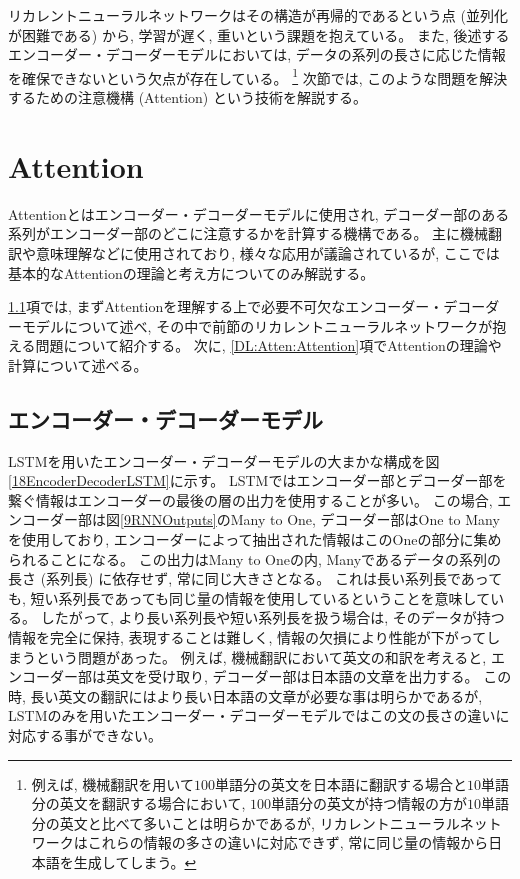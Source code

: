 リカレントニューラルネットワークはその構造が再帰的であるという点 (並列化が困難である) から, 学習が遅く, 重いという課題を抱えている。
また, 後述するエンコーダー・デコーダーモデルにおいては, データの系列の長さに応じた情報を確保できないという欠点が存在している。
\footnote{例えば, 機械翻訳を用いて$100$単語分の英文を日本語に翻訳する場合と$10$単語分の英文を翻訳する場合において, $100$単語分の英文が持つ情報の方が$10$単語分の英文と比べて多いことは明らかであるが, リカレントニューラルネットワークはこれらの情報の多さの違いに対応できず, 常に同じ量の情報から日本語を生成してしまう。}
次節では, このような問題を解決するための注意機構 (Attention) という技術を解説する。

\newpage
\section{Attention} \label{DL:Attention}

Attention\cite{BahdanauAttention, LuongAttention}とはエンコーダー・デコーダーモデルに使用され, デコーダー部のある系列がエンコーダー部のどこに注意するかを計算する機構である。
主に機械翻訳や意味理解などに使用されており, 様々な応用が議論されているが, ここでは基本的なAttentionの理論と考え方についてのみ解説する。

\ref{DL:Atten:EncoderDecoderModel}項では, まずAttentionを理解する上で必要不可欠なエンコーダー・デコーダーモデルについて述べ, その中で前節のリカレントニューラルネットワークが抱える問題について紹介する。
次に, \ref{DL:Atten:Attention}項でAttentionの理論や計算について述べる。


\subsection{エンコーダー・デコーダーモデル} \label{DL:Atten:EncoderDecoderModel}

LSTMを用いたエンコーダー・デコーダーモデルの大まかな構成を図\ref{18EncoderDecoderLSTM}に示す。
LSTMではエンコーダー部とデコーダー部を繋ぐ情報はエンコーダーの最後の層の出力を使用することが多い。
この場合, エンコーダー部は図\ref{9RNNOutputs}のMany to One, デコーダー部はOne to Manyを使用しており, エンコーダーによって抽出された情報はこのOneの部分に集められることになる。
この出力はMany to Oneの内, Manyであるデータの系列の長さ (系列長) に依存せず, 常に同じ大きさとなる。
これは長い系列長であっても, 短い系列長であっても同じ量の情報を使用しているということを意味している。
したがって, より長い系列長や短い系列長を扱う場合は, そのデータが持つ情報を完全に保持, 表現することは難しく, 情報の欠損により性能が下がってしまうという問題があった。
例えば, 機械翻訳において英文の和訳を考えると, エンコーダー部は英文を受け取り, デコーダー部は日本語の文章を出力する。
この時, 長い英文の翻訳にはより長い日本語の文章が必要な事は明らかであるが, LSTMのみを用いたエンコーダー・デコーダーモデルではこの文の長さの違いに対応する事ができない。

